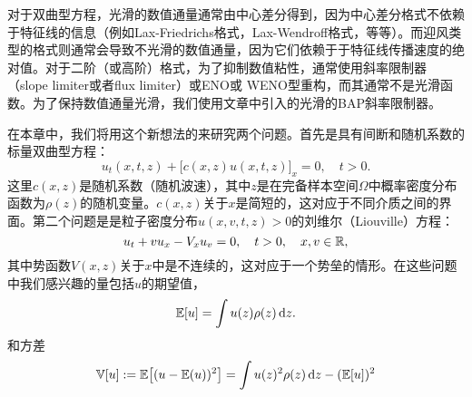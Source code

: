 
对于双曲型方程，光滑的数值通量通常由中心差分得到，因为中心差分格式不依赖于特征线的信息（例如Lax-Friedrichs格式，Lax-Wendroff格式，等等）。而迎风类型的格式则通常会导致不光滑的数值通量，因为它们依赖于于特征线传播速度的绝对值。对于二阶（或高阶）格式，为了抑制数值粘性，通常使用斜率限制器（slope limiter或者flux limiter）或ENO或
WENO型重构，而其通常不是光滑函数。为了保持数值通量光滑，我们使用文章中引入的光滑的BAP斜率限制器。

在本章中，我们将用这个新想法的来研究两个问题。首先是具有间断和随机系数的标量双曲型方程：
\begin{equation}
\label{conv-eq}
  u_t(x, t, z) + \big[c(x,z)u(x,t,z)\big]_x = 0, \quad t > 0.
\end{equation}
这里$c(x,z)$是随机系数（随机波速），其中$z$是在完备样本空间$\Omega$中概率密度分布函数为$\rho(z)$的随机变量。$c(x,z)$关于$x$是简短的，这对应于不同介质之间的界面。第二个问题是是粒子密度分布$u(x,v,t,z)>0$的刘维尔（Liouville）方程：
\begin{equation}\label{eq_Liou}
  u_t + v  u_x - V_x  u_v = 0, \quad t>0, \quad x, v \in {\mathbb{R}},
\end{equation}
其中势函数$V(x,z)$关于$x$中是不连续的，这对应于一个势垒的情形。在这些问题中我们感兴趣的量包括$u$的期望值，
\begin{equation}\label{exp}
  \mathbb{E}[u] = \int u(z) \rho(z)\mathop{}\!\mathrm{d} z.
\end{equation}
和方差
\begin{equation}\label{var}
  \mathbb{V}[u]:=\mathbb{E}\big[(u-\mathbb{E}(u))^2\big] = \int u(z)^2  \rho(z) \mathop{}\!\mathrm{d} z - (\mathbb{E}[u])^2
\end{equation}

